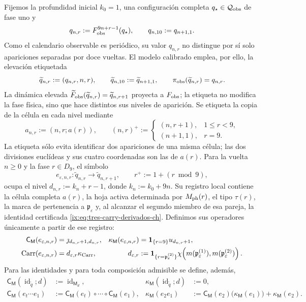 Fijemos la profundidad inicial \(k_0=1\), una configuración completa
\(q_\star\in\mathcal Q_{\rm obs}\) de fase uno y
\[
 q_{n,r}:=F_{\rm obs}^{9n+r-1}(q_\star),\qquad
 q_{n,10}:=q_{n+1,1}.
\]
Como el calendario observable es periódico, su valor \(q_{n,r}\) no
distingue por sí solo apariciones separadas por doce vueltas. El modelo
calibrado emplea, por ello, la elevación etiquetada
\[
 \widetilde q_{n,r}:=(q_{n,r},n,r),\qquad
 \widetilde q_{n,10}:=\widetilde q_{n+1,1},\qquad
 \pi_{\rm obs}(\widetilde q_{n,r})=q_{n,r}.
\]
La dinámica elevada
\(\widetilde F_{\rm obs}(\widetilde q_{n,r})
=\widetilde q_{n,r+1}\) proyecta a \(F_{\rm obs}\); la etiqueta no modifica
la fase física, sino que hace distintos sus niveles de aparición.
Se etiqueta la copia de la célula en cada nivel mediante
\[
 a_{n,r}:=(n,r;a(r)),\qquad
 (n,r)^+:=
 \begin{cases}
  (n,r+1),&1\le r<9,\\
  (n+1,1),&r=9.
 \end{cases}
\]
La etiqueta sólo evita identificar dos apariciones de una misma célula; las
dos divisiones euclídeas y sus cuatro coordenadas son las de \(a(r)\).
Para la vuelta \(n\ge0\) y la fase \(r\in D_9\), el símbolo
\[
 e_{\varepsilon,n,r}:\widetilde q_{n,r}
 \longrightarrow\widetilde q_{n,r+1},
 \qquad r^+:=1+(r\bmod9),
\]
ocupa el nivel
\(d_{n,r}:=k_n+r-1\), donde \(k_n:=k_0+9n\). Su registro local contiene
la célula completa \(a(r)\), la hoja activa determinada por \(M_{\rm ph}(r)\),
el tipo \(\tau(r)\),
la marca de pertenencia a \(\mathfrak p_\varepsilon\) y, al alcanzar el segundo miembro
de esa pareja, la identidad certificada
\eqref{ix:eq:tres-carry-derivados-ch}. Definimos sus operadores únicamente a
partir de ese registro:
\begin{align}
 \mathsf C_{\mathsf M}(e_{\varepsilon,n,r})
   &=\jmath_{d_{n,r}+1,d_{n,r}},&
 \kappa_{\mathsf M}(e_{\varepsilon,n,r})
   &=\mathbf1_{\{r=9\}}u_{d_{n,r}+1},
 \label{ix:eq:memoria-arista-ch}\\
       \operatorname{Carr}(e_{\varepsilon,n,r})
   &=d_{\varepsilon,r}\kappa_{\rm Carr},&
 d_{\varepsilon,r}
   &:=\mathbf1_{\{r=\mathfrak p_\varepsilon^{(2)}\}}
       \chi\!\left(m(\mathfrak p_\varepsilon^{(1)}),
                    m(\mathfrak p_\varepsilon^{(2)})\right).
 \label{ix:eq:carry-arista-derivado-ch}
\end{align}
Para las identidades y para toda composición admisible se define, además,
\begin{align}
 \mathsf C_{\mathsf M}(\operatorname{id}_{\widetilde q};d)
   &:=\operatorname{id}_{\mathsf M_d},&
 \kappa_{\mathsf M}(\operatorname{id}_{\widetilde q};d)&:=0,
 \label{ix:eq:memoria-identidad-ch}\\
 \mathsf C_{\mathsf M}(e_t\cdots e_1)
   &:=\mathsf C_{\mathsf M}(e_t)\circ\cdots\circ
      \mathsf C_{\mathsf M}(e_1),&
 \kappa_{\mathsf M}(e_2e_1)
   &:=\mathsf C_{\mathsf M}(e_2)
        \bigl(\kappa_{\mathsf M}(e_1)\bigr)
      +\kappa_{\mathsf M}(e_2).
 \label{ix:eq:cociclo-memoria-calibrado-ch}
\end{align}
